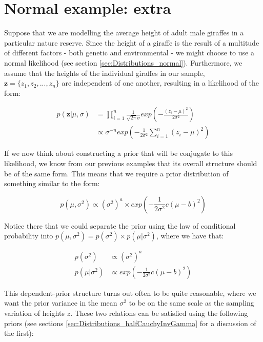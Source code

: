\documentclass[11pt,fullpage]{book}
\begin{document}
\section{Normal example: extra}\label{sec:conjugate_normal}
Suppose that we are modelling the average height of adult male giraffes in a particular nature reserve. Since the height of a giraffe is the result of a multitude of different factors - both genetic and environmental - we might choose to use a normal likelihood (see section \ref{sec:Distributions_normal}). Furthermore, we assume that the heights of the individual giraffes in our sample, $\boldsymbol{z} = \{z_1,z_2,...,z_n\}$ are independent of one another, resulting in a likelihood of the form:

\begin{equation}
\begin{align}
p(\boldsymbol{z}|\mu,\sigma) &= \prod\limits_{i=1}^{n}\frac{1}{\sqrt{2\pi} \sigma} exp\left(-\frac{(z_i-\mu)^2}{2\sigma^2}\right)\\
&\propto \sigma^{-n} exp\left(-\frac{1}{2\sigma^2}\sum\limits_{i=1}^{n}(z_i-\mu)^2 \right)
\end{align}
\end{equation} 

If we now think about constructing a prior that will be conjugate to this likelihood, we know from our previous examples that its overall structure should be of the same form. This means that we require a prior distribution of something similar to the form:

\begin{equation}
p(\mu,\sigma^2) \propto (\sigma^2)^a \times exp\left(-\frac{1}{2\sigma^2} c(\mu-b)^2 \right) 
\end{equation}

Notice there that we could separate the prior using the law of conditional probability into $p(\mu,\sigma^2) = p(\sigma^2)\times p(\mu|\sigma^2)$, where we have that:

\begin{align}
p(\sigma^2) &\propto (\sigma^2)^a\\
p(\mu|\sigma^2) &\propto exp\left(-\frac{1}{2\sigma^2} c(\mu-b)^2 \right)
\end{align}

This dependent-prior structure turns out often to be quite reasonable, where we want the prior variance in the mean $\sigma^2$ to be on the same scale as the sampling variation of heights $z$. These two relations can be satisfied using the following priors \cite{gelman2013bayesian} (see sections \ref{sec:Distributions_halfCauchyInvGamma} for a discussion of the first):
\end{document}
